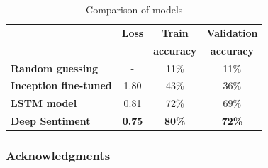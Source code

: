 \documentclass{article} %
\begin{document}
\begin{table}[H]
\caption{Comparison of models}
\begin{center}
    \begin{tabular}{ l | c | c | c}
    & \textbf{Loss} & \textbf{Train} & \textbf{Validation} \\
    & & \textbf{accuracy} & \textbf{accuracy} \\ \hline
    \textbf{Random guessing} & - & 11\% & 11\% \\ \hline
    \textbf{Inception fine-tuned}  & 1.80 & 43\% & 36\% \\ \hline
    \textbf{LSTM model} & 0.81 & 72\% & 69\% \\ \hline
    \textbf{Deep Sentiment} & \textbf{0.75} & \textbf{80\%} & \textbf{72\%} \\
    \end{tabular}
\end{center} 
\label{all-results}
\end{table}

\subsubsection*{Acknowledgments}




\end{document}
